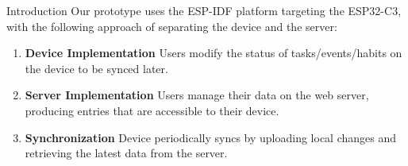 \documentclass[final]{beamer}
\newlength{\colwidth}
\begin{document}
\begin{frame}[t]
\begin{columns}[t]
\begin{column}{\colwidth}
\begin{block}{Introduction}
        Our prototype uses the ESP-IDF platform targeting the ESP32-C3,
        with the following approach of separating the device and the 
        server:

        \begin{enumerate}
          \item \textbf{Device Implementation} Users modify the status of 
            tasks/events/habits on the device to be synced later.
          \item \textbf{Server Implementation} Users manage their data on the
            web server, producing entries that are accessible to their device.
          \item \textbf{Synchronization} Device periodically syncs by uploading
            local changes and retrieving the latest data from the server. 
        \end{enumerate}

      \end{block}


\end{column}
\end{columns}
\end{frame}
\end{document}
